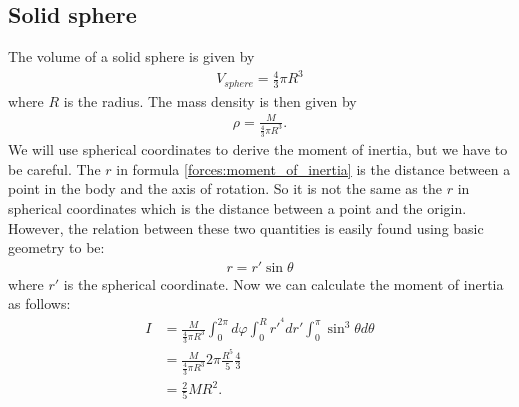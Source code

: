 \subsection{Solid sphere}

    The volume of a solid sphere is given by
    \begin{gather}
        V_{sphere} = \frac{4}{3}\pi R^3
    \end{gather}
    where $R$ is the radius. The mass density is then given by
    \begin{gather}
        \rho = \frac{M}{\frac{4}{3}\pi R^3}.
    \end{gather}
    We will use spherical coordinates to derive the moment of inertia, but we have to be careful. The $r$ in formula \ref{forces:moment_of_inertia} is the distance between a point in the body and the axis of rotation. So it is not the same as the $r$ in spherical coordinates which is the distance between a point and the origin. However, the relation between these two quantities is easily found using basic geometry to be:
    \begin{gather}
        r = r'\sin\theta
    \end{gather}
    where $r'$ is the spherical coordinate. Now we can calculate the moment of inertia as follows:
    \begin{align}
        I &= \frac{M}{\frac{4}{3}\pi R^3} \int_0^{2\pi}d\varphi\int_0^Rr'^{^4}dr'\int_0^\pi\sin^3\theta d\theta\\
        &= \frac{M}{\frac{4}{3}\pi R^3} 2\pi \frac{R^5}{5} \frac{4}{3}\\
        &= \frac{2}{5}MR^2.
    \end{align}